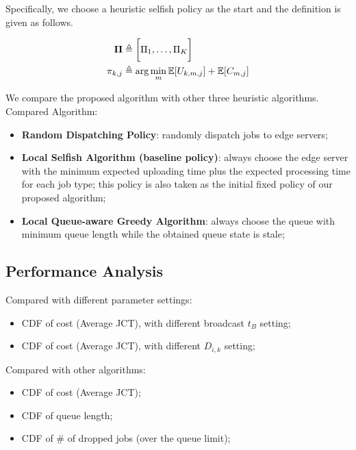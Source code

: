 Specifically, we choose a heuristic selfish policy as the start and the definition is given as follows.
\begin{definition}
    \begin{align}
        \boldsymbol{\Pi} &\triangleq \bigg[ \Pi_{1}, \dots, \Pi_{K} \bigg]
        \\
        \pi_{k,j} &\triangleq \arg\min_{m} \mathbb{E}[U_{k,m,j}] + \mathbb{E}[C_{m,j}]
    \end{align}
\end{definition}

We compare the proposed algorithm with other three heuristic algorithms.
Compared Algorithm:
\begin{itemize}
    \item \textbf{Random Dispatching Policy}:
            randomly dispatch jobs to edge servers;
    \item \textbf{Local Selfish Algorithm (baseline policy)}:
            always choose the edge server with the minimum expected uploading time plus the expected processing time for each job type; this policy is also taken as the initial fixed policy of our proposed algorithm;
    \item \textbf{Local Queue-aware Greedy Algorithm}:
            always choose the queue with minimum queue length while the obtained queue state is stale;
\end{itemize}


\subsection{Performance Analysis}
Compared with different parameter settings:
\begin{itemize}
    \item CDF of cost (Average JCT), with different broadcast $t_B$ setting;
    \item CDF of cost (Average JCT), with different \brlatency $D_{i,k}$ setting;
\end{itemize}

Compared with other algorithms:
\begin{itemize}
    \item CDF of cost (Average JCT);
    \item CDF of queue length;
    \item CDF of \# of dropped jobs (over the queue limit);
\end{itemize}